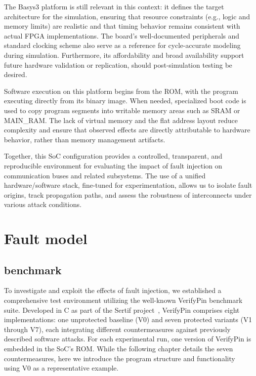 The Basys3 platform is still relevant in this context: it defines the target architecture for the simulation, ensuring that resource constraints (e.g., logic and memory limits) are realistic and that timing behavior remains consistent with actual FPGA implementations. The board’s well-documented peripherals and standard clocking scheme also serve as a reference for cycle-accurate modeling during simulation. Furthermore, its affordability and broad availability support future hardware validation or replication, should post-simulation testing be desired.

Software execution on this platform begins from the ROM, with the program executing directly from its binary image. When needed, specialized boot code is used to copy program segments into writable memory areas such as SRAM or MAIN\_RAM. The lack of virtual memory and the flat address layout reduce complexity and ensure that observed effects are directly attributable to hardware behavior, rather than memory management artifacts.

Together, this SoC configuration provides a controlled, transparent, and reproducible environment for evaluating the impact of fault injection on communication buses and related subsystems. The use of a unified hardware/software stack, fine-tuned for experimentation, allows us to isolate fault origins, track propagation paths, and assess the robustness of interconnects under various attack conditions.

\section{Fault model}

\subsection{benchmark}

To investigate and exploit the effects of fault injection, we established a comprehensive test environment utilizing the well-known VerifyPin benchmark suite. Developed in C as part of the Sertif project~\cite{dureuil2016fissc}, VerifyPin comprises eight implementations: one unprotected baseline (V0) and seven protected variants (V1 through V7), each integrating different countermeasures against previously described software attacks. For each experimental run, one version of VerifyPin is embedded in the SoC’s ROM. While the following chapter details the seven countermeasures, here we introduce the program structure and functionality using V0 as a representative example.

